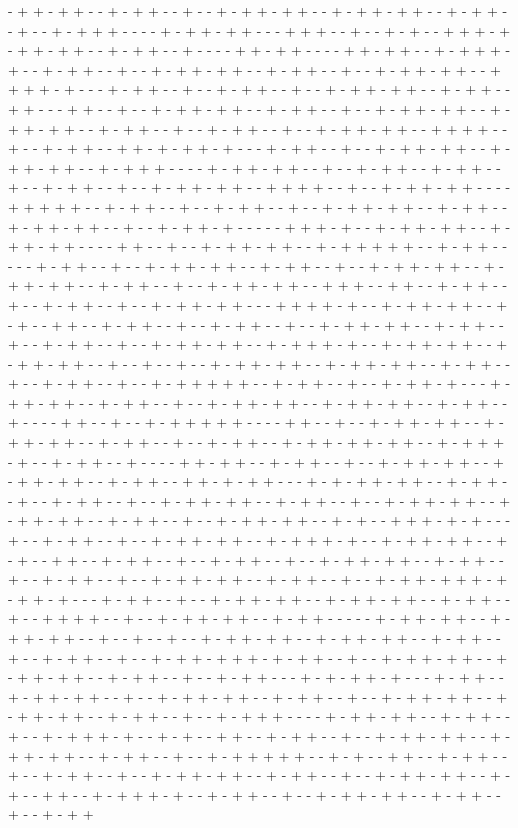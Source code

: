 - + + - + + - - + - + + - - + - - + - + + - + + - - + - + + - + + - - + - + + - - + - - + - + + + - - - - + - + + - + + - - - + + + - - + - - + - + - - + + + - + - + + - + + - - + - + + - - + - - - - + + - + + - - - - + + - + + - - + - + + + - + - - + - + + - - + - - + - + + - + + - - + - + + - - + - - + - + + - + + - - + + + + - + - - - + - + + - - + - - + - + + - - + - - + - + + - + + - - + - + + - - + + - - - + + - - + - - + - + + - + + - - + - + + - - + - - + - + + - + + - - + - + + - + + - - + - + + - - + - - + - + + - - + - - + - + + - + + - - + + + + - - + - - + - + + - - + + - + - + + - + - - - + - + + - - + - - + - + + - + + - - + - + + - + + - - + - + + + - - - - + - + + - + + - - + - - + - + + - - + - + + - - + - - + - + + - - + - - + - + + - + + - - + + + + - - + - - + - + + - + + - - - - + + + + + - - + - + + - - + - - + - + + - - + - - + - + + - + + - - + - + + - - + - + + - + + - - + - - + - + + - + - - - - - + + + - + - - + - + + - + + - - + - + + - + + - - - - + + - - + - - + - + + - + + - - + - + + + + + - - + - + + - - - - - + - + + - - + - - + - + + - + + - - + - + + - - + - - + - + + - + + - - + - + + - + + - - + - + + - - + - - + - + + - + + - - + + + - - + + - - + - + + - - + - - + - + + - - + - - + - + + - + + - - - + + + + - + - - + - + + - + + - - + - + - - + + - - + - + + - - + - - + - + + - - + - - + - + + - + + - - + - + + - - + - - + - + + - - + - - + - + + - + + - - + - + + + - + - - + - + + - + + - - + - + + - + + - - + - - + - - + - - + - + + - + + - - + - + + - + + - - + - + + - - + - - + - + + - - + - - + - + + + + + - - + - + + - - + - - + - + + - + - - - + - + + - + + - - + - + + - - + - - + - + + - + + - - + - + + - + + - - + - + + - - + - - - - + + - - + - - + - + + + + + - - - - + + - - + - - + - + + - + + - - + - + + - + + - - + - + + - - + - - + - + + - - + - + + - + + - + + - - + - + + + - + - - + - + + - - + - - - - + + - + + - - + - + + - - + - - + - + + - + + - - + - + + - + + - - + - + + - - + + - + - + + - - - + - + - + + - + + - - + - + + - - + - - + - + + - - + - - + - + + - + + - - + - + + - - + - - + - + + - + + - - + - + + - + + - - + - + + - - + - - + - + + - + + - - + - + - - + + + - + - + - - - + - - + - + + - - + - - + - + + - + + - - + - + + + - + - - + - + + - + + - - + - + - - + + - - + - + + - - + - - + - + + - - + - - + - + + - + + - - + - + + - - + - - + - + + - - + - - + - + + - + + - - + - + + - - + - - + - + + - + + + - + - + + - + - - - + - + + - - + - - + - + + - + + - - + - + + - + + - - + - + + - - + - - + + + + - - + - - + - + + - + + - - + - + + - - - - - + - + + - + + - - + - + + - + + - - + - - + - - + - - + - + + - + + - - + - + + - + + - - + - + + - - + - - + - + + - - + - - + - + + - + + + - + - + + - - + - - + - + + - + + - - + - + + - + + - - + - + + - - + - - + - + + - - - + - + - + + - + - - - + - + + - - + - + + - + + - - + - - + - + + - + + - - + - + + - - + - - + - + + - + + - - + - + + - + + - - + - + + - - + - - + - + + + - - - - + - + + - + + - - + - + + - - + - - + - + + + - + - - + - + - - + + - - + - + + - - + - - + - + + - + + - - + - + + - + + - - + - + + - - + - - + - + + + + + - - + - + - - + + - - + - + + - - + - - + - + + - - + - - + - + + - + + - - + - + + - - + - - + - + + - + + - - + - + - - + + - - + - + + + - + - - + - + + - - + - - + - + + - + + - - + - + + - - + - - + - + + 